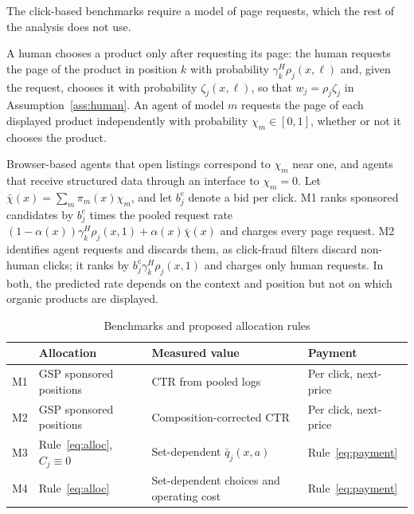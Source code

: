 \documentclass[opre,dblanonrev]{informs4}
\providecommand{\1}{\mathbf{1}}
\begin{document}
The click-based benchmarks require a model of page requests, which the rest of the analysis does not use.
\begin{assumption}\label{ass:retrieval}
A human chooses a product only after requesting its page: the human requests the page of the product in position $k$ with probability $\gamma_k^H\rho_j(x,\ell)$ and, given the request, chooses it with probability $\zeta_j(x,\ell)$, so that $w_j=\rho_j\zeta_j$ in Assumption~\ref{ass:human}. An agent of model $m$ requests the page of each displayed product independently with probability $\chi_m\in[0,1]$, whether or not it chooses the product.
\end{assumption}
Browser-based agents that open listings correspond to $\chi_m$ near one, and agents that receive structured data through an interface to $\chi_m=0$. Let $\bar\chi(x)=\sum_m\pi_m(x)\chi_m$, and let $b_j^{\mathrm c}$ denote a bid per click. M1 ranks sponsored candidates by $b_j^{\mathrm c}$ times the pooled request rate $(1-\alpha(x))\gamma_k^H\rho_j(x,1)+\alpha(x)\bar\chi(x)$ and charges every page request. M2 identifies agent requests and discards them, as click-fraud filters discard non-human clicks; it ranks by $b_j^{\mathrm c}\gamma_k^H\rho_j(x,1)$ and charges only human requests. In both, the predicted rate depends on the context and position but not on which organic products are displayed.

\begin{table}[htbp]
\centering\small
\caption{Benchmarks and proposed allocation rules}\label{tab:model-benchmarks}
\begin{tabularx}{\textwidth}{@{}l>{\raggedright\arraybackslash}X>{\raggedright\arraybackslash}X>{\raggedright\arraybackslash}X@{}}
\toprule
& Allocation & Measured value & Payment \\
\midrule
M1 & GSP sponsored positions & CTR from pooled logs & Per click, next-price \\
M2 & GSP sponsored positions & Composition-corrected CTR & Per click, next-price \\
M3 & Rule~\eqref{eq:alloc}, $C_j\equiv0$ & Set-dependent $\bar q_j(x,a)$ & Rule~\eqref{eq:payment} \\
M4 & Rule~\eqref{eq:alloc} & Set-dependent choices and operating cost & Rule~\eqref{eq:payment} \\
\bottomrule
\end{tabularx}
\end{table}
\end{document}
